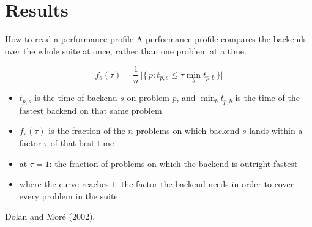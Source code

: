 \documentclass[10pt,mathserif,aspectratio=169]{beamer}
\newcommand{\bul}{\setlength\itemsep{1.1ex}}
\begin{document}
\section{Results}

\begin{frame}[label=bk-profile]{How to read a performance profile}
\vspace{-0.5ex}
{\small A performance profile compares the backends over the whole suite at once, rather than
one problem at a time.}

\vspace{2ex}
\[
  f_s(\tau) = \frac{1}{n}\,\bigl|\{\, p : t_{p,s} \le \tau \textstyle\min_b t_{p,b}
  \,\}\bigr|
\]

\vspace{1ex}
\begin{itemize}\small\bul
  \item $t_{p,s}$ is the time of backend $s$ on problem $p$, and $\min_b t_{p,b}$ is the time
        of the fastest backend on that same problem
  \item $f_s(\tau)$ is the fraction of the $n$ problems on which backend $s$ lands within a
        factor $\tau$ of that best time
  \item {\color{polyblue}at $\tau = 1$}: the fraction of problems on which the backend is
        outright fastest
  \item {\color{polyblue}where the curve reaches $1$}: the factor the backend needs in order to
        cover every problem in the suite
\end{itemize}

\vspace{1.5ex}
{\scriptsize\color{black!55} Dolan and Mor\'e (2002).}
\end{frame}
\end{document}
